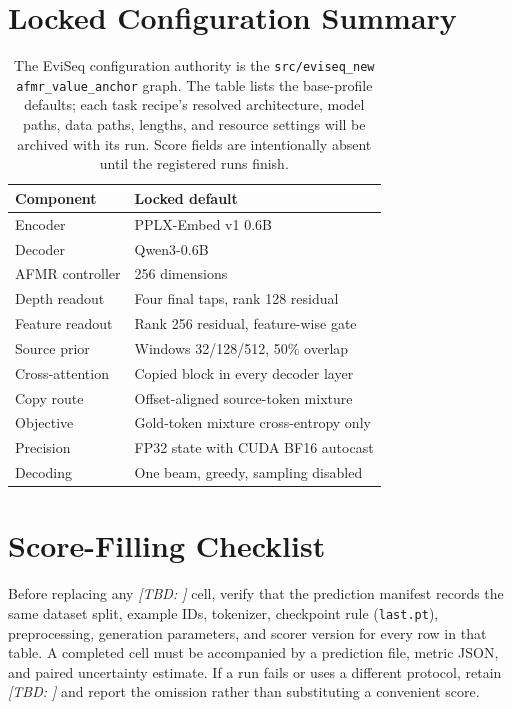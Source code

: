 \documentclass[11pt]{article}
\newcommand{\EviSeq}{EviSeq\xspace}
\newcommand{\AFMR}{AFMR\xspace}
\newcommand{\PPLXEmbed}{PPLX-Embed v1 0.6B\xspace}
\newcommand{\QwenZeroSix}{Qwen3-0.6B\xspace}
\newcommand{\tbd}[1]{\textit{[TBD: #1]}}
\begin{document}
\section{Locked Configuration Summary}
\label{app:config}
\begin{table}[t]
\centering
\small
\begin{tabular}{@{}ll@{}}
\toprule
Component & Locked default \\
\midrule
Encoder & \PPLXEmbed \\
Decoder & \QwenZeroSix \\
\AFMR controller & 256 dimensions \\
Depth readout & Four final taps, rank 128 residual \\
Feature readout & Rank 256 residual, feature-wise gate \\
Source prior & Windows 32/128/512, 50\% overlap \\
Cross-attention & Copied block in every decoder layer \\
Copy route & Offset-aligned source-token mixture \\
Objective & Gold-token mixture cross-entropy only \\
Precision & FP32 state with CUDA BF16 autocast \\
Decoding & One beam, greedy, sampling disabled \\
\bottomrule
\end{tabular}
\caption{The \EviSeq configuration authority is the \texttt{src/eviseq\_new} \texttt{afmr\_value\_anchor} graph. The table lists the base-profile defaults; each task recipe's resolved architecture, model paths, data paths, lengths, and resource settings will be archived with its run. Score fields are intentionally absent until the registered runs finish.}
\label{tab:config}
\end{table}

\section{Score-Filling Checklist}
\label{app:checklist}
Before replacing any \tbd{} cell, verify that the prediction manifest records the same dataset split, example IDs, tokenizer, checkpoint rule (\texttt{last.pt}), preprocessing, generation parameters, and scorer version for every row in that table. A completed cell must be accompanied by a prediction file, metric JSON, and paired uncertainty estimate. If a run fails or uses a different protocol, retain \tbd{} and report the omission rather than substituting a convenient score.
\end{document}
